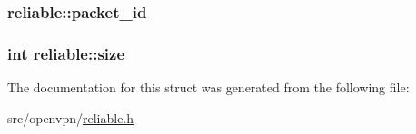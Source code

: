 \subsubsection[{packet\+\_\+id}]{ reliable\+::packet\+\_\+id}\label{structreliable_a565cf23e829f768c537aaf4a99d5d72f}
\hypertarget{structreliable_a410412e1f605ae7a0fe5b3d4db8de35f}{}
\subsubsection[{size}]{\setlength{\rightskip}{0pt plus 5cm}int reliable\+::size}\label{structreliable_a410412e1f605ae7a0fe5b3d4db8de35f}


The documentation for this struct was generated from the following file\+:\begin{DoxyCompactItemize}
\item 
src/openvpn/\hyperlink{reliable_8h}{reliable.\+h}\end{DoxyCompactItemize}
